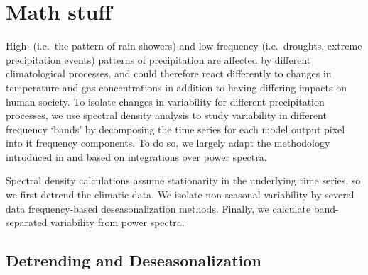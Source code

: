 \documentclass{article}
\begin{document}
\section{Math stuff}
High- (i.e.\ the pattern of rain showers) and low-frequency (i.e.\ droughts, extreme precipitation events) patterns of precipitation are affected by different climatological processes, and could therefore react differently to changes in temperature and gas concentrations in addition to having differing impacts on human society. To isolate changes in variability for different precipitation processes, we use spectral density analysis to study variability in different frequency `bands' by decomposing the time series for each model output pixel into it frequency components. To do so, we largely adapt the methodology introduced in \cite{leeds_simulation_2015} and \cite{klavans_influence_2016} based on integrations over power spectra.

Spectral density calculations assume stationarity in the underlying time series, so we first detrend the climatic data. We isolate non-seasonal variability by several data frequency-based deseasonalization methods. Finally, we calculate band-separated variability from power spectra. 
\subsection{Detrending and Deseasonalization} %
\label{sec:detrend_deseas}
\end{document}
